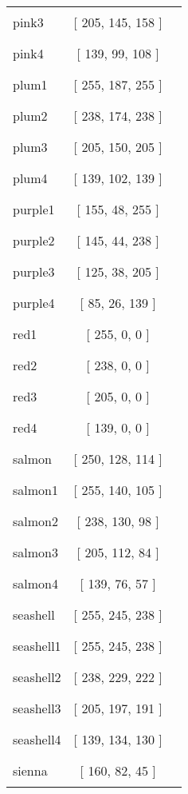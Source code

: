 \begin{tabular}{|l|c|c|}
pink3 & [ 205, 145, 158 ] & \color{pink3} \rule{1cm}{1.5ex}\\
pink4 & [ 139, 99, 108 ] & \color{pink4} \rule{1cm}{1.5ex}\\
plum1 & [ 255, 187, 255 ] & \color{plum1} \rule{1cm}{1.5ex}\\
plum2 & [ 238, 174, 238 ] & \color{plum2} \rule{1cm}{1.5ex}\\
plum3 & [ 205, 150, 205 ] & \color{plum3} \rule{1cm}{1.5ex}\\
plum4 & [ 139, 102, 139 ] & \color{plum4} \rule{1cm}{1.5ex}\\
purple1 & [ 155, 48, 255 ] & \color{purple1} \rule{1cm}{1.5ex}\\
purple2 & [ 145, 44, 238 ] & \color{purple2} \rule{1cm}{1.5ex}\\
purple3 & [ 125, 38, 205 ] & \color{purple3} \rule{1cm}{1.5ex}\\
purple4 & [ 85, 26, 139 ] & \color{purple4} \rule{1cm}{1.5ex}\\
red1 & [ 255, 0, 0 ] & \color{red1} \rule{1cm}{1.5ex}\\
red2 & [ 238, 0, 0 ] & \color{red2} \rule{1cm}{1.5ex}\\
red3 & [ 205, 0, 0 ] & \color{red3} \rule{1cm}{1.5ex}\\
red4 & [ 139, 0, 0 ] & \color{red4} \rule{1cm}{1.5ex}\\
salmon & [ 250, 128, 114 ] & \color{salmon} \rule{1cm}{1.5ex}\\
salmon1 & [ 255, 140, 105 ] & \color{salmon1} \rule{1cm}{1.5ex}\\
salmon2 & [ 238, 130, 98 ] & \color{salmon2} \rule{1cm}{1.5ex}\\
salmon3 & [ 205, 112, 84 ] & \color{salmon3} \rule{1cm}{1.5ex}\\
salmon4 & [ 139, 76, 57 ] & \color{salmon4} \rule{1cm}{1.5ex}\\
seashell & [ 255, 245, 238 ] & \color{seashell} \rule{1cm}{1.5ex}\\
seashell1 & [ 255, 245, 238 ] & \color{seashell1} \rule{1cm}{1.5ex}\\
seashell2 & [ 238, 229, 222 ] & \color{seashell2} \rule{1cm}{1.5ex}\\
seashell3 & [ 205, 197, 191 ] & \color{seashell3} \rule{1cm}{1.5ex}\\
seashell4 & [ 139, 134, 130 ] & \color{seashell4} \rule{1cm}{1.5ex}\\
sienna & [ 160, 82, 45 ] & \color{sienna} \rule{1cm}{1.5ex}\\

\end{tabular}
